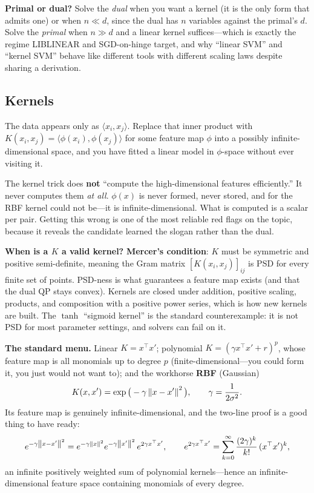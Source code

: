 \textbf{Primal or dual?} Solve the \emph{dual} when you want a kernel (it is the only form that admits one) or when $n \ll d$, since the dual has $n$ variables against the primal's $d$. Solve the \emph{primal} when $n \gg d$ and a linear kernel suffices---which is exactly the regime LIBLINEAR and SGD-on-hinge target, and why ``linear SVM'' and ``kernel SVM'' behave like different tools with different scaling laws despite sharing a derivation.

\subsection{Kernels}

The data appears only as $\langle x_i, x_j\rangle$. Replace that inner product with $K(x_i,x_j) = \langle \phi(x_i), \phi(x_j)\rangle$ for some feature map $\phi$ into a possibly infinite-dimensional space, and you have fitted a linear model in $\phi$-space without ever visiting it.

\begin{warningbox}
The kernel trick does \textbf{not} ``compute the high-dimensional features efficiently.'' It never computes them \emph{at all}. $\phi(x)$ is never formed, never stored, and for the RBF kernel could not be---it is infinite-dimensional. What is computed is a scalar per pair. Getting this wrong is one of the most reliable red flags on the topic, because it reveals the candidate learned the slogan rather than the dual.
\end{warningbox}

\textbf{When is a $K$ a valid kernel?} \textbf{Mercer's condition}: $K$ must be symmetric and positive semi-definite, meaning the Gram matrix $[K(x_i,x_j)]_{ij}$ is PSD for every finite set of points. PSD-ness is what guarantees a feature map exists (and that the dual QP stays convex). Kernels are closed under addition, positive scaling, products, and composition with a positive power series, which is how new kernels are built. The $\tanh$ ``sigmoid kernel'' is the standard counterexample: it is not PSD for most parameter settings, and solvers can fail on it.

\textbf{The standard menu.} Linear $K = x^{\top}x'$; polynomial $K = (\gamma x^{\top}x' + r)^p$, whose feature map is all monomials up to degree $p$ (finite-dimensional---you could form it, you just would not want to); and the workhorse \textbf{RBF} (Gaussian)
\begin{equation}
K(x,x') = \exp\big(-\gamma\left\lVert x-x'\right\rVert^2\big), \qquad \gamma = \frac{1}{2\sigma^2}.
\end{equation}
Its feature map is genuinely infinite-dimensional, and the two-line proof is a good thing to have ready:
\begin{equation}
e^{-\gamma\left\lVert x-x'\right\rVert^2} = e^{-\gamma\left\lVert x\right\rVert^2}e^{-\gamma\left\lVert x'\right\rVert^2}\,e^{2\gamma x^{\top}x'},
\qquad
e^{2\gamma x^{\top}x'} = \sum_{k=0}^{\infty}\frac{(2\gamma)^k}{k!}\,(x^{\top}x')^k ,
\end{equation}
an infinite positively weighted sum of polynomial kernels---hence an infinite-dimensional feature space containing monomials of every degree.

